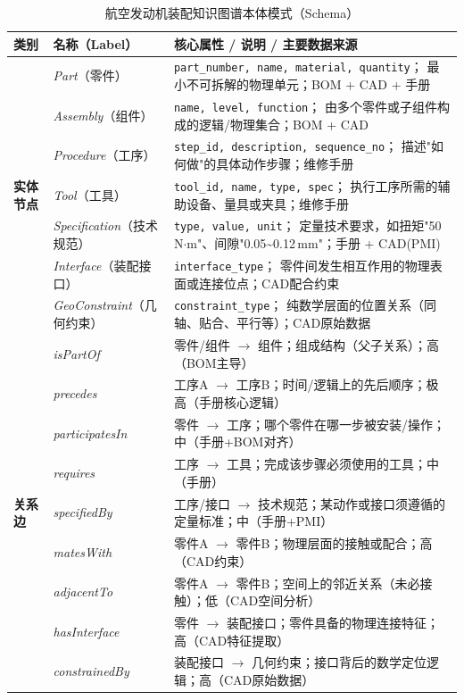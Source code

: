 \begin{table}[htbp]
  \centering
  \caption{航空发动机装配知识图谱本体模式（Schema）}
  \label{tab:ontology}
  \renewcommand{\arraystretch}{1.3}
  \begin{tabularx}{\linewidth}{llX}
    \toprule
    \textbf{类别} & \textbf{名称（Label）} & \textbf{核心属性 / 说明 / 主要数据来源} \\
    \midrule
    \multirow{7}{*}{\textbf{实体节点}}
      & \textit{Part}（零件）
        & \texttt{part\_number, name, material, quantity}；
          最小不可拆解的物理单元；BOM + CAD + 手册 \\
      & \textit{Assembly}（组件）
        & \texttt{name, level, function}；
          由多个零件或子组件构成的逻辑/物理集合；BOM + CAD \\
      & \textit{Procedure}（工序）
        & \texttt{step\_id, description, sequence\_no}；
          描述"如何做"的具体动作步骤；维修手册 \\
      & \textit{Tool}（工具）
        & \texttt{tool\_id, name, type, spec}；
          执行工序所需的辅助设备、量具或夹具；维修手册 \\
      & \textit{Specification}（技术规范）
        & \texttt{type, value, unit}；
          定量技术要求，如扭矩"50\,N$\cdot$m"、间隙"0.05\textasciitilde0.12\,mm"；手册 + CAD(PMI) \\
      & \textit{Interface}（装配接口）
        & \texttt{interface\_type}；
          零件间发生相互作用的物理表面或连接位点；CAD配合约束 \\
      & \textit{GeoConstraint}（几何约束）
        & \texttt{constraint\_type}；
          纯数学层面的位置关系（同轴、贴合、平行等）；CAD原始数据 \\
    \midrule
    \multirow{9}{*}{\textbf{关系边}}
      & \textit{isPartOf}
        & 零件/组件 $\rightarrow$ 组件；组成结构（父子关系）；高（BOM主导） \\
      & \textit{precedes}
        & 工序A $\rightarrow$ 工序B；时间/逻辑上的先后顺序；极高（手册核心逻辑） \\
      & \textit{participatesIn}
        & 零件 $\rightarrow$ 工序；哪个零件在哪一步被安装/操作；中（手册+BOM对齐） \\
      & \textit{requires}
        & 工序 $\rightarrow$ 工具；完成该步骤必须使用的工具；中（手册） \\
      & \textit{specifiedBy}
        & 工序/接口 $\rightarrow$ 技术规范；某动作或接口须遵循的定量标准；中（手册+PMI） \\
      & \textit{matesWith}
        & 零件A $\rightarrow$ 零件B；物理层面的接触或配合；高（CAD约束） \\
      & \textit{adjacentTo}
        & 零件A $\rightarrow$ 零件B；空间上的邻近关系（未必接触）；低（CAD空间分析） \\
      & \textit{hasInterface}
        & 零件 $\rightarrow$ 装配接口；零件具备的物理连接特征；高（CAD特征提取） \\
      & \textit{constrainedBy}
        & 装配接口 $\rightarrow$ 几何约束；接口背后的数学定位逻辑；高（CAD原始数据） \\
    \bottomrule
  \end{tabularx}
\end{table}


